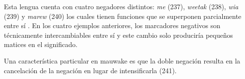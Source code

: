 Esta lengua cuenta con cuatro negadores distintos: {\setmainfont{Charis SIL} \textit{me}} (237), {\setmainfont{Charis SIL} \textit{weetak}} (238), {\setmainfont{Charis SIL} \textit{wia}} (239) y {\setmainfont{Charis SIL} \textit{marew}} (240) los cuales tienen funciones que se superponen parcialmente entre sí \textcolor{MidnightBlue}{\citep{mauwake}}. En los cuatro ejemplos anteriores, los marcadores negativos son técnicamente intercambiables entre sí y este cambio solo produciría pequeños matices en el significado.

Una característica particular en mauwake es que la doble negación resulta en la cancelación de la negación en lugar de intensificarla (241).